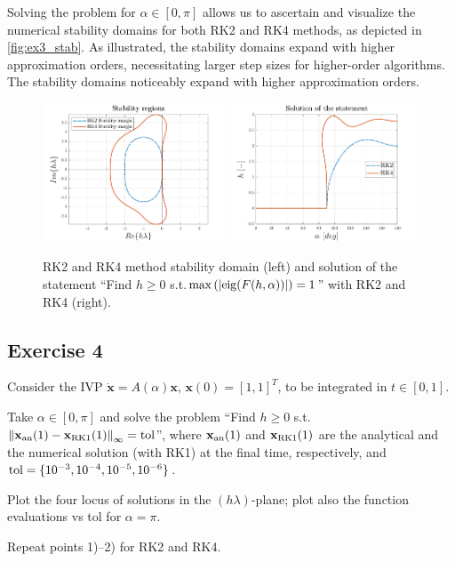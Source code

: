 \documentclass[11pt,a4paper,oneside]{article}
\renewcommand{\vec}[1]{\mathbf{#1}}
\begin{document}
Solving the problem for $\alpha\in[0, \pi]$  allows us to ascertain and visualize the numerical 
stability domains for both RK2 and RK4 methods, as depicted in \autoref{fig:ex3_stab}. 
As illustrated, the stability domains expand with higher approximation orders, 
necessitating larger step sizes for higher-order algorithms. The stability domains noticeably 
expand with higher approximation orders.
\begin{figure}[h]
    \centering
    \includegraphics[width=0.49\textwidth]{gfx/ex3_2.pdf}
    \includegraphics[width=0.49\textwidth]{gfx/ex3_1.pdf}
    \caption{RK2 and RK4 method stability domain (left) and solution of the statement ``Find $h\ge 0$ s.t.$\max\left(|{\rm eig}(F(h,\alpha))|\right) = 1$'' with RK2 and RK4 (right).}
    \label{fig:ex3_stab}
\end{figure}

\subsection*{Exercise 4}

Consider the IVP $\dot{\vec x}=A(\alpha)\vec x$, $\vec x(0) = [1, 1]^T$, to be integrated in $t\in[0, 1]$.
\begin{enumerate*}[label=\arabic*)]
    \item Take $\alpha\in[0, \pi]$ and solve the problem ``Find $h\ge 0$ s.t. $\left\|\vec x_{\rm an}(1)-\vec x_{\rm RK1}(1)\right\|_\infty = \mathrm{tol}$'', where $\vec x_{\rm an}(1)$ and $\vec x_{\rm RK1}(1)$ are the analytical and the numerical solution (with RK1) at the final time, respectively, and $\rm tol = \{10^{-3}, 10^{-4}, 10^{-5}, 10^{-6}\}$.
    \item Plot the four locus of solutions in the $(h\lambda)$-plane; plot also the function evaluations vs tol for $\alpha= \pi$.
    \item Repeat points 1)--2) for RK2 and RK4.
\end{enumerate*}
\end{document}
